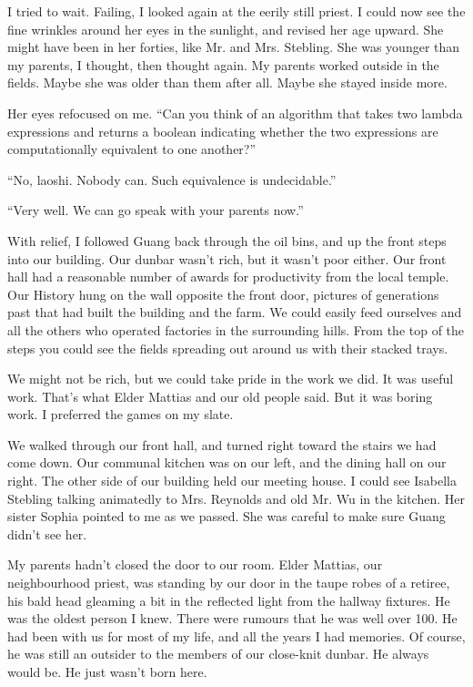 I tried to wait. Failing, I looked again at the eerily still priest. I could now see the fine wrinkles around her eyes in the sunlight, and revised her age upward. She might have been in her forties, like Mr. and Mrs. Stebling. She was younger than my parents, I thought, then thought again. My parents worked outside in the fields. Maybe she was older than them after all. Maybe she stayed inside more.

Her eyes refocused on me. ``Can you think of an algorithm that takes two lambda expressions and returns a boolean indicating whether the two expressions are computationally equivalent to one another?''

``No, laoshi. Nobody can. Such equivalence is undecidable.''

``Very well. We can go speak with your parents now.''

With relief, I followed Guang back through the oil bins, and up the front steps into our building. Our dunbar wasn't rich, but it wasn't poor either. Our front hall had a reasonable number of awards for productivity from the local temple. Our History hung on the wall opposite the front door, pictures of generations past that had built the building and the farm. We could easily feed ourselves and all the others who operated factories in the surrounding hills. From the top of the steps you could see the fields spreading out around us with their stacked trays.

We might not be rich, but we could take pride in the work we did. It was useful work. That's what Elder Mattias and our old people said. But it was boring work. I preferred the games on my slate.

We walked through our front hall, and turned right toward the stairs we had come down. Our communal kitchen was on our left, and the dining hall on our right. The other side of our building held our meeting house. I could see Isabella Stebling talking animatedly to Mrs. Reynolds and old Mr. Wu in the kitchen. Her sister Sophia pointed to me as we passed. She was careful to make sure Guang didn't see her.

My parents hadn't closed the door to our room. Elder Mattias, our neighbourhood priest, was standing by our door in the taupe robes of a retiree, his bald head gleaming a bit in the reflected light from the hallway fixtures. He was the oldest person I knew. There were rumours that he was well over 100. He had been with us for most of my life, and all the years I had memories. Of course, he was still an outsider to the members of our close-knit dunbar. He always would be. He just wasn't born here.

